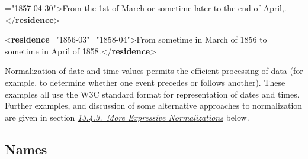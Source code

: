 \begin{shaded}
{\hspace*{1em}{to}="{1857-04-30}">}From the 1st of March or sometime later to the end of April,\mbox{}.{</\textbf{residence}>}\end{shaded}\egroup\par \noindent  \par\bgroup{}\exampleFont \begin{shaded}\noindent\mbox{}{<\textbf{residence}\hspace*{1em}{from}="{1856-03}"\hspace*{1em}{to}="{1858-04}">}From sometime in March of 1856 to sometime in April of 1858.{</\textbf{residence}>}\end{shaded}\egroup\par \par
Normalization of date and time values permits the efficient processing of data (for example, to determine whether one event precedes or follows another). These examples all use the W3C standard format for representation of dates and times. Further examples, and discussion of some alternative approaches to normalization are given in section \textit{\hyperref[NDDATEISO]{13.4.3.\ More Expressive Normalizations}} below.
\subsection[{Names}]{Names}\label{NDNA}
